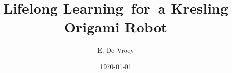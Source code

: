 \documentclass[noroman, 11pt]{tudelft-report}
\title[tudelft-white]{Lifelong Learning~for~a Kresling Origami Robot}
\subtitle[tudelft-sea-green]{\thesubtitle}
\author[tudelft-white]{E. De Vroey}
\date{\today}
\affiliation{Technische Universiteit Delft}
\begin{document}
    \frontmatter

    \makecover

    

    

    ~\nocite{*}
    

    \mainmatter
    

\end{document}

